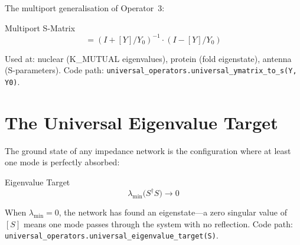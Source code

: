 The multiport generalisation of Operator~3:
\begin{resultbox}{Multiport S-Matrix}
\begin{equation}
    [S] = (I + [Y]/Y_0)^{-1} \cdot (I - [Y]/Y_0)
    \label{eq:y_to_s}
\end{equation}
\end{resultbox}

Used at: nuclear (K\_MUTUAL eigenvalues), protein (fold eigenstate),
antenna (S-parameters).
Code path: \texttt{universal\_operators.universal\_ymatrix\_to\_s(Y, Y0)}.

\section{The Universal Eigenvalue Target}
\label{sec:universal_eigenvalue}

The ground state of any impedance network is the configuration where
at least one mode is perfectly absorbed:
\begin{resultbox}{Eigenvalue Target}
\begin{equation}
    \lambda_\text{min}\bigl(S^\dagger S\bigr) \to 0
    \label{eq:eigenvalue_target}
\end{equation}
\end{resultbox}

When $\lambda_\text{min} = 0$, the network has found an eigenstate---a
zero singular value of $[S]$ means one mode passes through the system
with no reflection.  Code path: \texttt{universal\_\allowbreak operators.\allowbreak universal\_\allowbreak eigenvalue\_\allowbreak target(S)}.

